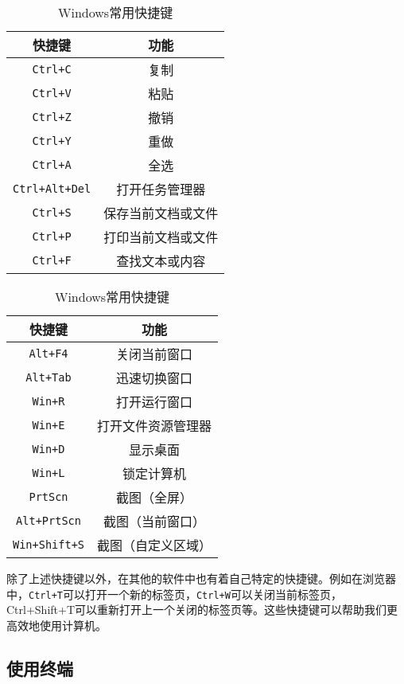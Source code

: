 \documentclass[../main.tex]{subfiles}
\begin{document}
\begin{table}[ht]
  \centering
  \caption{Windows常用快捷键}
  \label{tab:windows-shortcuts}
  \begin{tabular}[t]{c|c}
    \hline
    \textbf{快捷键} & \textbf{功能} \\
    \hline
    \texttt{Ctrl+C} & 复制 \\
    \texttt{Ctrl+V} & 粘贴 \\
    \texttt{Ctrl+Z} & 撤销 \\
    \texttt{Ctrl+Y} & 重做 \\
    \texttt{Ctrl+A} & 全选 \\
    \texttt{Ctrl+Alt+Del} & 打开任务管理器 \\
    \texttt{Ctrl+S} & 保存当前文档或文件 \\
    \texttt{Ctrl+P} & 打印当前文档或文件 \\
    \texttt{Ctrl+F} & 查找文本或内容 \\
    \hline
  \end{tabular}
  \qquad
  \begin{tabular}[t]{c|c}
    \hline
    \textbf{快捷键} & \textbf{功能} \\
    \hline
    \texttt{Alt+F4} & 关闭当前窗口 \\
    \texttt{Alt+Tab} & 迅速切换窗口 \\
    \texttt{Win+R} & 打开运行窗口 \\
    \texttt{Win+E} & 打开文件资源管理器 \\
    \texttt{Win+D} & 显示桌面 \\
    \texttt{Win+L} & 锁定计算机 \\
    \texttt{PrtScn} & 截图（全屏） \\
    \texttt{Alt+PrtScn} & 截图（当前窗口） \\
    \texttt{Win+Shift+S} & 截图（自定义区域） \\
    \hline
  \end{tabular}
\end{table}

除了上述快捷键以外，在其他的软件中也有着自己特定的快捷键。例如在浏览器中，\texttt{Ctrl+T}可以打开一个新的标签页，\texttt{Ctrl+W}可以关闭当前标签页，Ctrl+Shift+T可以重新打开上一个关闭的标签页等。这些快捷键可以帮助我们更高效地使用计算机。

\subsection{使用终端}\label{sec:terminal}
\end{document}
